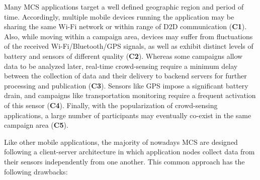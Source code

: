 Many MCS applications target a well defined geographic region and period of time. Accordingly, multiple mobile devices running the application may be sharing the same Wi-Fi network or within range of D2D communication (\textbf{C1}). Also, while moving within a campaign area, devices may suffer from fluctuations of the received Wi-Fi/Bluetooth/GPS signals, as well as exhibit distinct levels of battery and sensors of different quality (\textbf{C2}).
Whereas some campaigns allow data to be analyzed later, real-time crowd-sensing require a minimum delay between the collection of data and their delivery to backend servers for further processing and publication (\textbf{C3}). Sensors like GPS impose a significant battery drain, and campaigns like transportation monitoring require a frequent activation of this sensor (\textbf{C4}). Finally, with the popularization of crowd-sensing applications, a large number of participants may eventually co-exist in the same campaign area (\textbf{C5}). 

Like other mobile applications, the majority of nowadays MCS are designed following a client-server architecture in which application nodes collect data from their sensors independently from one another. 
This common approach has the following drawbacks:


